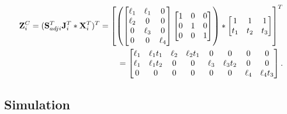 \documentclass[12pt]{article}
\begin{document}
\begin{align}
{\mathbf Z}^{C}_{i} = ({\mathbf S}^{T}_{adji}{\mathbf J}^{T}_{i} \ast {\mathbf X}^{T}_{i})^{T} =
\left[
\left(
\begin{bmatrix}
\ell_{1} & \ell_{1}  & 0 \\
\ell_{2} &  0  & 0 \\
0  &  \ell_{3} & 0 \\
0 & 0 &  \ell_{4} 
\end{bmatrix}
\begin{bmatrix}
1 & 0  & 0 \\
0 & 1  & 0 \\
0 & 0  & 1  
\end{bmatrix}
\right)
\ast
\begin{bmatrix}
1   & 1   & 1  \\ 
t_1 & t_2 & t_3
\end{bmatrix} 
\right]^T
\\
= \begin{bmatrix}
\ell_{1} & \ell_{1}t_1 & \ell_{2} & \ell_{2}t_1 & 0 & 0 & 0 & 0 \\
\ell_{1} & \ell_{1}t_2 & 0 & 0 & \ell_{3} & \ell_{3}t_2 & 0 & 0 \\
0 & 0 & 0 & 0 & 0 & 0 & \ell_{4} & \ell_{4}t_3
\end{bmatrix}.
\end{align}


% 
% 

\subsection*{Simulation}
\end{document}
